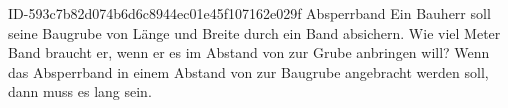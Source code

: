 \begin{exercise}
      {ID-593c7b82d074b6d6c8944ec01e45f107162e029f}
      {Absperrband}
  \ifproblem\problem
    Ein Bauherr soll seine Baugrube von  Länge und  Breite
    durch ein Band absichern. Wie viel Meter Band braucht er, wenn er es im
    Abstand von  zur Grube anbringen will?
  \fi
  \ifoutcome\outcome
    Wenn das Absperrband in einem Abstand von  zur Baugrube angebracht
    werden soll, dann muss es  lang sein.
  \fi
\end{exercise}
